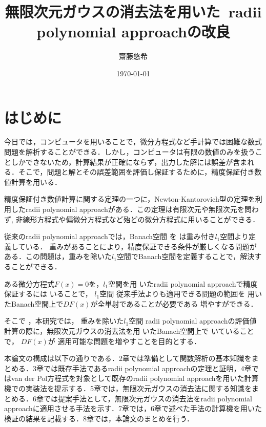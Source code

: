 \documentclass[11pt,a4paper,titlepage]{jsreport}
\title{無限次元ガウスの消去法を用いた\ radii polynomial approachの改良}
\author{齋藤悠希}
\date{\today}
\theoremstyle{definition}
\newcommand{\rad}{radii polynomial approach}
\newcommand{\vdp}{van der Pol}
\newcommand{\infg}{無限次元ガウスの消去法}
\providecommand{\DIFadd}[1]{{\protect\color{blue} \sf #1}} %
\providecommand{\DIFdel}[1]{{\protect\color{red} \scriptsize #1}} %
\providecommand{\DIFaddbegin}{} %
\providecommand{\DIFaddend}{} %
\providecommand{\DIFdelbegin}{} %
\providecommand{\DIFdelend}{} %
\newcommand{\DIFscaledelfig}{0.5}
\newlength{\DIFdelgraphicswidth} %
\newlength{\DIFdelgraphicsheight} %
\newcommand{\DIFaddincludegraphics}[2][]{{\color{blue}\fbox{\DIFOincludegraphics[#1]{#2}}}} %
\newcommand{\DIFdelincludegraphics}[2][]{%
\sbox{\DIFdelgraphicsbox}{\DIFOincludegraphics[#1]{#2}}%
\settoboxwidth{\DIFdelgraphicswidth}{\DIFdelgraphicsbox} %
\settoboxtotalheight{\DIFdelgraphicsheight}{\DIFdelgraphicsbox} %
\scalebox{\DIFscaledelfig}{%
\parbox[b]{\DIFdelgraphicswidth}{\usebox{\DIFdelgraphicsbox}\\[-\baselineskip] \rule{\DIFdelgraphicswidth}{0em}}\llap{\resizebox{\DIFdelgraphicswidth}{\DIFdelgraphicsheight}{%
\setlength{\unitlength}{\DIFdelgraphicswidth}%
\begin{picture}(1,1)%
\thicklines\linethickness{2pt} %
{\color[rgb]{1,0,0}\put(0,0){\framebox(1,1){}}}%
{\color[rgb]{1,0,0}\put(0,0){\line( 1,1){1}}}%
{\color[rgb]{1,0,0}\put(0,1){\line(1,-1){1}}}%
\end{picture}%
}\hspace*{3pt}}} %
} %
\DeclareRobustCommand{\DIFaddbegin}{\DIFOaddbegin \let\includegraphics\DIFaddincludegraphics} %
\DeclareRobustCommand{\DIFaddend}{\DIFOaddend \let\includegraphics\DIFOincludegraphics} %
\DeclareRobustCommand{\DIFdelbegin}{\DIFOdelbegin \let\includegraphics\DIFdelincludegraphics} %
\DeclareRobustCommand{\DIFdelend}{\DIFOaddend \let\includegraphics\DIFOincludegraphics} %
\begin{document}

\pagestyle{empty}
\maketitle
\tableofcontents
\clearpage
\pagestyle{plain}

 \newpage \chapter{はじめに}

今日では，コンピュータを用いることで，微分方程式など手計算では困難な数式問題を解析することができる．しかし，コンピュータは有限の数値のみを扱うことしかできないため，計算結果が正確にならず，出力した解には誤差が含まれる．そこで，問題と解とその誤差範囲を評価し保証するために，精度保証付き数値計算を用いる\cite{b1}．

精度保証付き数値計算に関する定理の一つに，Newton-Kantorovich型の定理を利用したradii polynomial approachがある．この定理は有限次元や無限次元を問わず, 非線形方程式や偏微分方程式など殆どの微分方程式に用いることができる．

従来の\rad{}では，Banach空間\DIFdelbegin \DIFdel{を}\DIFdelend \DIFaddbegin \DIFadd{は}\DIFaddend 重み付き$l_1$空間より定義している．\DIFdelbegin \DIFdel{重みがあることにより，精度保証できる条件が厳しくなる問題がある．この問題は，重みを除いた$l_1$空間でBanach空間を定義することで，解決することができる．
}%

\DIFdel{ある微分方程式$F(x)=0$を，}\DIFdelend $l_1$空間を用\DIFdelbegin \DIFdel{いた\rad{}で精度保証するには}\DIFdelend \DIFaddbegin \DIFadd{いることで}\DIFaddend ，\DIFdelbegin \DIFdel{$l_1$空間}\DIFdelend \DIFaddbegin \DIFadd{従来手法よりも適用できる問題の範囲}\DIFaddend を\DIFdelbegin \DIFdel{用いたBanach空間上で$DF(x)$が全単射であることが必要である}\DIFdelend \DIFaddbegin \DIFadd{増やすができる}\DIFaddend ．\DIFdelbegin %

\DIFdelend そこで\DIFaddbegin \DIFadd{，}\DIFaddend 本研究では，\DIFdelbegin \DIFdel{重みを除いた$l_1$空間}\DIFdelend \DIFaddbegin \DIFadd{\rad{}の評価値計算の際に，\infg{}}\DIFaddend を用\DIFdelbegin \DIFdel{いたBanach空間上で}\DIFdelend \DIFaddbegin \DIFadd{いていることで}\DIFaddend ，\DIFdelbegin \DIFdel{$DF(x)$が
}\DIFdelend \DIFaddbegin \DIFadd{適用可能な問題を増やすことを目的とする．
}\DIFaddend 


本論文の構成は以下の通りである．2章では準備として関数解析の基本知識をまとめる．3章では既存手法である\rad{}の定理と証明，4章では\vdp{}方程式を対象として既存の\rad{}を用いた計算機での実装法を提示する．5章では，無限次元ガウスの消去法に関する知識をまとめる．6章では提案手法として，無限次元ガウスの消去法を\rad{}に適用させる手法を示す．7章では，6章で述べた手法の計算機を用いた検証の結果を記載する．8章では，本論文のまとめを行う．
\end{document}
